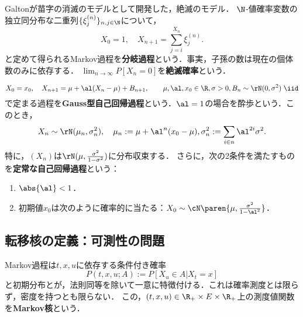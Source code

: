 \documentclass[uplatex,dvipdfmx]{jsreport}
\begin{document}
\begin{definition}
    Galtonが苗字の消滅のモデルとして開発した，絶滅のモデル．
    $\N$-値確率変数の独立同分布な二重列$\{\xi_j^{(n)}\}_{n,j\in\N}$について，
    \[X_0=1,\quad X_{n+1}=\sum_{j=i}^{X_n}\xi^{(n)}_j.\]
    と定めて得られるMarkov過程を\textbf{分岐過程}という．事実，子孫の数は現在の個体数のみに依存する．
    $\lim_{n\to\infty}P[X_n=0]$を\textbf{絶滅確率}という．
\end{definition}

\begin{example}
    \[X_0=x_0,\quad X_{n+1}=\mu+\al(X_n-\mu)+B_{n+1},\qquad\mu,\al,x_0\in\R,\sigma>0,B_n\sim\rN(0,\sigma^2)\;\iid\]
    で定まる過程を\textbf{Gauss型自己回帰過程}という．$\al=1$の場合を酔歩という．このとき，
    \[X_n\sim\rN(\mu_n,\sigma^2_n),\quad\mu_n:=\mu+\al^n(x_0-\mu),\sigma^2_n:=\sum_{i\in n}\al^{2i}\sigma^2.\]
    特に，$(X_n)$は$\rN(\mu,\frac{\sigma^2}{1-\sigma^2})$に分布収束する．
    さらに，次の2条件を満たすものを\textbf{定常な自己回帰過程}という：
    \begin{enumerate}
        \item $\abs{\al}<1$．
        \item 初期値$x_0$は次のように確率的に当たる：$X_0\sim\cN\paren{\mu,\frac{\sigma^2}{1-\al^2}}$．
    \end{enumerate}
\end{example}

\subsection{転移核の定義：可測性の問題}

\begin{tcolorbox}[colframe=ForestGreen, colback=ForestGreen!10!white,breakable,colbacktitle=ForestGreen!40!white,coltitle=black,fonttitle=\bfseries\sffamily,
title=]
    Markov過程は$t,x,u$に依存する条件付き確率
    \[P(t,x,u;A):=P[X_{u}\in A|X_t=x]\]
    と初期分布とが，法則同等を除いて一意に特徴付ける．これは確率測度とは限らず，密度を持つとも限らない．
    この，$(t,x,u)\in\R_+\times E\times\R_+$上の測度値関数を\textbf{Markov核}という．
\end{tcolorbox}
\end{document}
